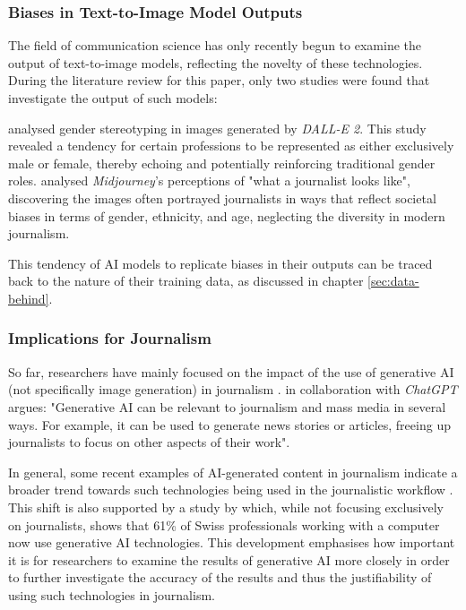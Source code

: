 \label{sec:data-behind}

\subsubsection{Biases in Text-to-Image Model Outputs}
The field of communication science has only recently begun to examine the output of text-to-image models, reflecting the novelty of these technologies. During the literature review for this paper, only two studies were found that investigate the output of such models:

\textcite{Garcia2023} analysed gender stereotyping in images generated by \textit{DALL-E 2}. This study revealed a tendency for certain professions to be represented as either exclusively male or female, thereby echoing and potentially reinforcing traditional gender roles. \textcite{Thomas2023} analysed \textit{Midjourney}'s perceptions of "what a journalist looks like", discovering the images often portrayed journalists in ways that reflect societal biases in terms of gender, ethnicity, and age, neglecting the diversity in modern journalism.

This tendency of AI models to replicate biases in their outputs can be traced back to the nature of their training data, as discussed in chapter \ref{sec:data-behind}. 

\subsubsection{Implications for Journalism}

So far, researchers have mainly focused on the impact of the use of generative AI (not specifically image generation) in journalism \parencite{Broussard2019}. \textcite[87]{Pavlik2023} in collaboration with \textit{ChatGPT} argues: "Generative AI can be relevant to journalism and mass media in several ways. For example, it can be used to generate news stories or articles, freeing up journalists to focus on other aspects of their work".

In general, some recent examples of AI-generated content in journalism indicate a broader trend towards such technologies being used in the journalistic workflow \parencite{Henrich2023, Kim2023}. This shift is also supported by a study by \textcite{Deloitte2023} which, while not focusing exclusively on journalists, shows that 61\% of Swiss professionals working with a computer now use generative AI technologies. This development emphasises how important it is for researchers to examine the results of generative AI more closely in order to further investigate the accuracy of the results and thus the justifiability of using such technologies in journalism.

